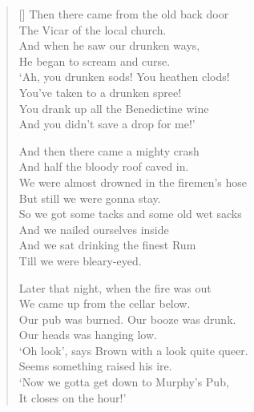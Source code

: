 \begin{verse}[\versewidth]
Then there came from the old back door\\
The Vicar of the local church.\\
And when he saw our drunken ways,\\
He began to scream and curse.\\
`Ah, you drunken sods! You heathen clods!\\
You've taken to a drunken spree!\\
You drank up all the Benedictine wine\\
And you didn't save a drop for me!'

And then there came a mighty crash\\
And half the bloody roof caved in.\\
We were almost drowned in the firemen's hose\\
But still we were gonna stay.\\
So we got some tacks and some old wet sacks\\
And we nailed ourselves inside\\
And we sat drinking the finest Rum\\
Till we were bleary-eyed.


Later that night, when the fire was out\\
We came up from the cellar below.\\
Our pub was burned. Our booze was drunk.\\
Our heads was hanging low.\\
`Oh look', says Brown with a look quite queer.\\
Seems something raised his ire.\\
`Now we gotta get down to Murphy's Pub,\\
It closes on the hour!'


\end{verse}
